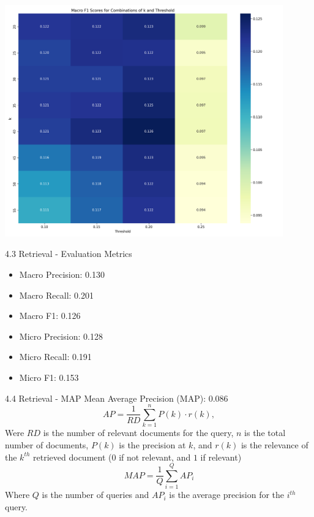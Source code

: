 \documentclass{beamer}
\begin{document}
\begin{frame}
  \centering
  \includegraphics[width=0.9\textwidth]{ir_parameter_heatmap1747239585.png}
\end{frame}

\begin{frame}{4.3 Retrieval - Evaluation Metrics}
  \begin{itemize}
    \item Macro Precision: 0.130
    \item Macro Recall: 0.201
    \item Macro F1: 0.126
    \item Micro Precision: 0.128
    \item Micro Recall: 0.191
    \item Micro F1: 0.153
  \end{itemize}
\end{frame}

\begin{frame}{4.4 Retrieval - MAP}
  Mean Average Precision (MAP): 0.086
  \begin{equation}
    AP = \frac{1}{RD} \sum_{k=1}^{n} P(k) \cdot r(k),
  \end{equation}
  Were $RD$  is the number of relevant documents for the query, $n$ is the total number of documents, $P(k)$
  is the precision at $k$, and $r(k)$ is the relevance of the $k^{th}$ retrieved document ($0$ if not relevant, and $1$ if
  relevant)
  \begin{equation}
    MAP = \frac{1}{Q} \sum_{i=1}^{Q} AP_i
  \end{equation}
  Where $Q$ is the number of queries and $AP_i$ is the average precision for the $i^{th}$ query.
\end{frame}
\end{document}
